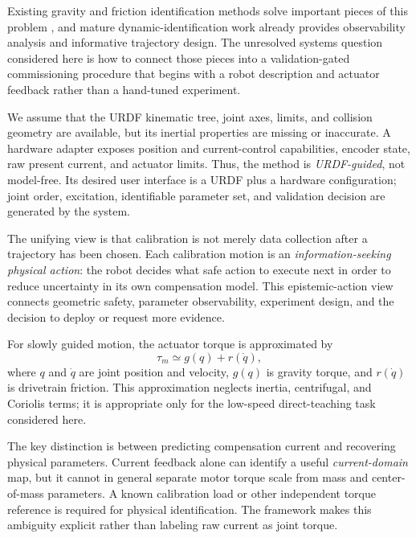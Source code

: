 \documentclass[conference]{IEEEtran}
\begin{document}
Existing gravity and friction identification methods solve important pieces of
this problem \cite{Chen2018,Chen2023}, and mature dynamic-identification work
already provides observability analysis and informative trajectory design.
The unresolved systems question considered here is how to connect those pieces
into a validation-gated commissioning procedure that begins with a robot
description and actuator feedback rather than a hand-tuned experiment.

We assume that the URDF kinematic tree, joint axes, limits, and collision
geometry are available, but its inertial properties are missing or inaccurate.
A hardware adapter exposes position and current-control capabilities, encoder
state, raw present current, and actuator limits. Thus, the method is
\emph{URDF-guided}, not model-free. Its desired user interface is a URDF plus a
hardware configuration; joint order, excitation, identifiable parameter set,
and validation decision are generated by the system.

The unifying view is that calibration is not merely data collection after a
trajectory has been chosen. Each calibration motion is an
\emph{information-seeking physical action}: the robot decides what safe action
to execute next in order to reduce uncertainty in its own compensation model.
This epistemic-action view connects geometric safety, parameter observability,
experiment design, and the decision to deploy or request more evidence.

For slowly guided motion, the actuator torque is approximated by
\begin{equation}
 \tau_m \simeq g(q) + r(\dot{q}),
 \label{eq:quasistatic}
\end{equation}
where $q$ and $\dot{q}$ are joint position and velocity, $g(q)$ is gravity
torque, and $r(\dot{q})$ is drivetrain friction. This approximation neglects
inertia, centrifugal, and Coriolis terms; it is appropriate only for the
low-speed direct-teaching task considered here.

The key distinction is between predicting compensation current and recovering
physical parameters. Current feedback alone can identify a useful
\emph{current-domain} map, but it cannot in general separate motor torque scale
from mass and center-of-mass parameters. A known calibration load or other
independent torque reference is required for physical identification. The
framework makes this ambiguity explicit rather than labeling raw current as
joint torque.
\end{document}
